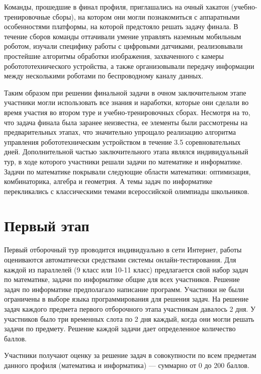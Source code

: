 \documentclass[a4paper,12pt,oneside]{book}
\begin{document}
Команды, прошедшие в финал профиля, приглашались на очный хакатон
(учебно-тренировочные сборы), на котором они могли познакомиться с
аппаратными  особенностями платформы, на которой предстояло решать
задачу финала. В течение сборов команды оттачивали умение управлять
наземным мобильным роботом,  изучали специфику работы с цифровыми
датчиками, реализовывали простейшие алгоритмы обработки изображения,
захваченного с камеры роботототехнического устройства, а также
организовывали передачу информации между несколькими роботами по
беспроводному каналу данных.

Таким образом при решении финальной задачи в очном заключительном
этапе участники могли использовать все знания и наработки, которые они
сделали во  время участия во втором туре и учебно-тренировочных
сборах. Несмотря на то, что задача финала была заранее неизвестна, ее
элементы были рассмотрены на  предварительных этапах, что значительно
упрощало реализацию алгоритма управления робототехническим устройством
в течение 3.5 соревновательных дней.  Дополнительной частью
заключительного этапа являлся индивидуальный тур, в ходе которого
участники решали задачи по математике и информатике.  Задачи по
математике покрывали следующие области математики: оптимизация,
комбинаторика, алгебра и геометрия. А темы задач по информатике
перекликались с классическими темами всероссийской олимпиады
школьников.

\part{Первый этап}
\newpage
Первый отборочный тур проводится индивидуально в сети Интернет,
работы оцениваются автоматически средствами системы
онлайн-тестирования.
Для каждой из параллелей (9 класс или 10-11
класс)
предлагается свой набор задач по математике, задачи по информатике общие
для всех участников. Решение задач по информатике предполагало
написание программ. Участники не были ограничены в выборе языка программирования для
решения задач. На решение
задач каждого предмета первого отборочного этапа участникам давалось 2
дня. У участников было три временных слота по 2 дня каждый, когда они
могли решать задачи по предмету. Решение каждой задачи дает
определенное количество баллов.

Участники получают оценку за решение задач
в совокупности по всем предметам данного профиля (математика и
информатика) --- суммарно от 0 до 200 баллов.



\end{document}
